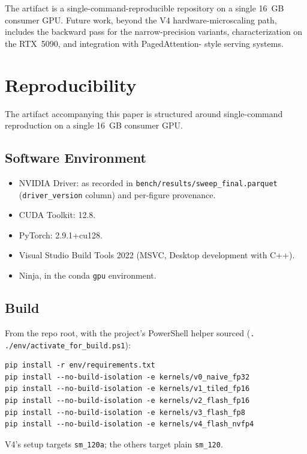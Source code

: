 \documentclass[conference]{IEEEtran}
\begin{document}
The artifact is a single-command-reproducible repository on a single
16~GB consumer GPU. Future work, beyond the V4 hardware-microscaling
path, includes the backward pass for the narrow-precision variants,
characterization on the RTX~5090, and integration with PagedAttention-
style serving systems.




\appendices

\section{Reproducibility}
\label{app:repro}

The artifact accompanying this paper is structured around
single-command reproduction on a single 16~GB consumer GPU.

\subsection{Software Environment}
\begin{itemize}
  \item NVIDIA Driver: as recorded in
        \texttt{bench/results/sweep\_final.parquet} (\texttt{driver\_version}
        column) and per-figure provenance.
  \item CUDA Toolkit: 12.8.
  \item PyTorch: 2.9.1+cu128.
  \item Visual Studio Build Tools 2022 (MSVC, Desktop development
        with C++).
  \item Ninja, in the conda \texttt{gpu} environment.
\end{itemize}

\subsection{Build}

From the repo root, with the project's PowerShell helper sourced
(\texttt{. ./env/activate\_for\_build.ps1}):
\begin{lstlisting}
pip install -r env/requirements.txt
pip install --no-build-isolation -e kernels/v0_naive_fp32
pip install --no-build-isolation -e kernels/v1_tiled_fp16
pip install --no-build-isolation -e kernels/v2_flash_fp16
pip install --no-build-isolation -e kernels/v3_flash_fp8
pip install --no-build-isolation -e kernels/v4_flash_nvfp4
\end{lstlisting}
V4's setup targets \texttt{sm\_120a}; the others target plain
\texttt{sm\_120}.
\end{document}
